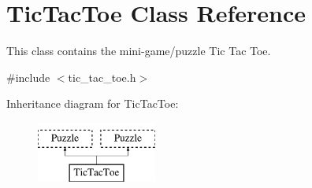 \hypertarget{classTicTacToe}{\section{Tic\-Tac\-Toe Class Reference}
\label{classTicTacToe}
}


This class contains the mini-\/game/puzzle Tic Tac Toe.  




{\ttfamily \#include $<$tic\-\_\-tac\-\_\-toe.\-h$>$}

Inheritance diagram for Tic\-Tac\-Toe\-:\begin{figure}[H]
\begin{center}
\leavevmode
\includegraphics[height=2.000000cm]{classTicTacToe}
\end{center}
\end{figure}
